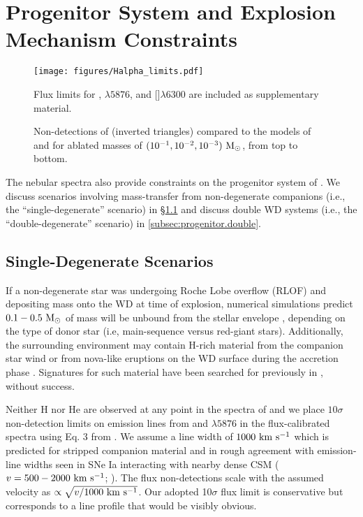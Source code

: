 \documentclass[twocolumn]{aastex63}
\begin{document}
\section{Progenitor System and Explosion Mechanism Constraints}\label{sec:progenitor}

\begin{figure}
    \centering
    \texttt{[image: figures/Halpha\_limits.pdf]}
    \caption{Non-detections of \Ha (inverted triangles) compared to the models of \citet[][dotted lines, $100\, \rm d \lesssim t_{\rm{max}} \lesssim 300\,\rm d$]{dessart2020} and \citet[][dashed lines, $200\,\rm d \lesssim t_{\rm{max}} \lesssim 500\,\rm d$]{botyanszki2018} for ablated masses of $(10^{-1}, 10^{-2}, 10^{-3})~\rm M_\odot$, from top to bottom.} Flux limits for \Ha, $\lambda5876$, and []$\lambda6300$ are included as supplementary material.
    \label{fig:Hlims}
\end{figure}

The nebular spectra also provide constraints on the progenitor system of \name. We discuss scenarios involving mass-transfer from non-degenerate companions (i.e., the ``single-degenerate'' scenario) in \S\ref{subsec:progenitor.single} and discuss double WD systems (i.e., the ``double-degenerate'' scenario) in \ref{subsec:progenitor.double}. 


\subsection{Single-Degenerate Scenarios}\label{subsec:progenitor.single}

If a non-degenerate star was undergoing Roche Lobe overflow (RLOF) and depositing mass onto the WD at time of explosion, numerical simulations predict ${0.1-0.5~ \rm M_\odot}$ of mass will be unbound from the stellar envelope \citep[e.g., ][]{marietta2000, pan2012a, boehner2017}, depending on the type of donor star (i.e, main-sequence versus red-giant stars). Additionally, the surrounding environment may contain H-rich material from the companion star wind or from nova-like eruptions on the WD surface during the accretion phase \citep[e.g, ][]{hamuy2003, walder2008, moore2012}. Signatures for such material have been searched for previously in \name \citep{shappee2013, lundqvist2015, graham2015b}, without success. 

Neither H nor He are observed at any point in the spectra of \name and we place $10\sigma$ non-detection limits on emission lines from \Ha and $\lambda5876$ in the flux-calibrated spectra using Eq. 3 from \citet{tucker2020}. We assume a line width of $1000~\rm{km}~\rm s^{-1}$ which is predicted for stripped companion material \citep[e.g., ][]{boehner2017} and in rough agreement with emission-line widths seen in SNe Ia interacting with nearby dense CSM ($v = 500-2000~\rm{km}~\rm s^{-1}$; \citealp{silverman2013, silverman2013b, graham2019}). The flux non-detections scale with the assumed velocity as $\propto \sqrt{ v / 1000 ~ \rm{km}~\rm{s}^{-1} }$. Our adopted 10$\sigma$ flux limit is conservative but corresponds to a line profile that would be visibly obvious.
\end{document}
